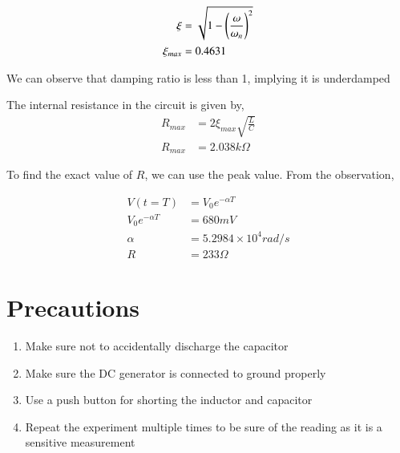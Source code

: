 \documentclass[journal]{IEEEtran}
\begin{document}
\begin{align*}
    \xi &= \sqrt{1- \left(\frac{\omega}{\omega_n}\right)^2}\\
    \xi_{max} &= 0.4631
\end{align*}

We can observe that damping ratio is less than 1, implying it is underdamped

The internal resistance in the circuit is given by,
\begin{align*}
    R_{max} &= 2\xi_{max}\sqrt{\frac{L}{C}}\\
    R_{max} &= 2.038 k\Omega
\end{align*}

To find the exact value of $R$, we can use the peak value. From the observation,

\begin{align*}
	V(t=T) &= V_0e^{-\alpha T}\\
	V_0e^{-\alpha T} &= 680 mV\\
	\alpha &= 5.2984\times10^{4} rad/s\\
	R &= 233 \Omega
\end{align*}

\section{Precautions}

\begin{enumerate}
	\item Make sure not to accidentally discharge the capacitor
	\item Make sure the DC generator is connected to ground properly
	\item Use a push button for shorting the inductor and capacitor
	\item Repeat the experiment multiple times to be sure of the reading as it is a sensitive measurement
\end{enumerate}
\end{document}
